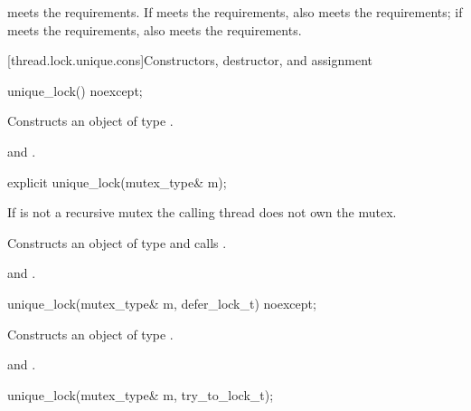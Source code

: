 \pnum
\begin{note}
 meets the  requirements. If 
meets the  requirements,
 also meets the  requirements;
if 
meets the  requirements,
 also meets the  requirements.
\end{note}

[thread.lock.unique.cons]{Constructors, destructor, and assignment}

%
\begin{itemdecl}
unique_lock() noexcept;
\end{itemdecl}

\begin{itemdescr}
\pnum
\effects
Constructs an object of type .

\pnum
\ensures
{} and .
\end{itemdescr}

%
\begin{itemdecl}
explicit unique_lock(mutex_type& m);
\end{itemdecl}

\begin{itemdescr}
\pnum
\requires If  is not a recursive mutex the calling thread does not own the mutex.

\pnum
\effects
Constructs an object of type  and calls .

\pnum
\ensures
{} and .
\end{itemdescr}

%
\begin{itemdecl}
unique_lock(mutex_type& m, defer_lock_t) noexcept;
\end{itemdecl}

\begin{itemdescr}
\pnum
\effects
Constructs an object of type .

\pnum
\ensures
{} and .
\end{itemdescr}

%
\begin{itemdecl}
unique_lock(mutex_type& m, try_to_lock_t);
\end{itemdecl}

